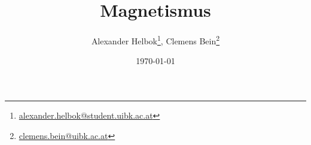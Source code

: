 \thispagestyle{empty}
\titlehead{\texttt{[image: logo.jpg]}}
\title{Magnetismus}
\author{Alexander Helbok\thanks{\href{mailto:alexander.helbok@student.uibk.ac.at}{alexander.helbok@student.uibk.ac.at}},\hspace{5pt} Clemens Bein\thanks{\href{mailto:clemens.bein@uibk.ac.at}{clemens.bein@uibk.ac.at}}}
\date{\today}
\maketitle
\vfill 